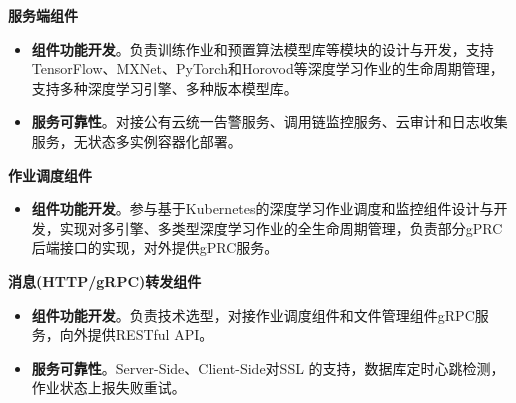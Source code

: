 \documentclass{resume}
\begin{document}

\begin{onehalfspacing}
\textbf{服务端组件}    
\begin{itemize}%
  \item \textbf{组件功能开发}。负责训练作业和预置算法模型库等模块的设计与开发，支持TensorFlow、MXNet、PyTorch和Horovod等深度学习作业的生命周期管理，支持多种深度学习引擎、多种版本模型库。%
  \item \textbf{服务可靠性}。对接公有云统一告警服务、调用链监控服务、云审计和日志收集服务，无状态多实例容器化部署。
\end{itemize}

\begin{onehalfspacing}
\textbf{作业调度组件}  
\begin{itemize}%
  \item \textbf{组件功能开发}。参与基于Kubernetes的深度学习作业调度和监控组件设计与开发，实现对多引擎、多类型深度学习作业的全生命周期管理，负责部分gPRC后端接口的实现，对外提供gPRC服务。
\end{itemize}

\begin{onehalfspacing}
\textbf{消息(HTTP/gRPC)转发组件}  
\begin{itemize}%
  \item \textbf{组件功能开发}。负责技术选型，对接作业调度组件和文件管理组件gRPC服务，向外提供RESTful API。
  \item \textbf{服务可靠性}。Server-Side、Client-Side对SSL 的支持，数据库定时心跳检测，作业状态上报失败重试。
\end{itemize}
\end{onehalfspacing}

\end{onehalfspacing}

\end{onehalfspacing}
\end{document}
